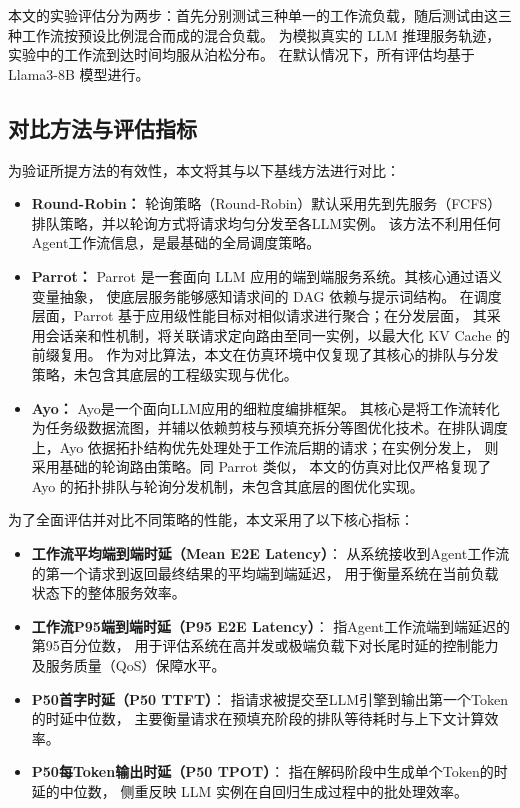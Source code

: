 本文的实验评估分为两步：首先分别测试三种单一的工作流负载，随后测试由这三种工作流按预设比例混合而成的混合负载。
为模拟真实的 LLM 推理服务轨迹，实验中的工作流到达时间均服从泊松分布。
在默认情况下，所有评估均基于 Llama3-8B 模型进行。


\subsection{对比方法与评估指标}

为验证所提方法的有效性，本文将其与以下基线方法进行对比：

\begin{itemize}
  \item \textbf{Round-Robin：}
        轮询策略（Round-Robin）默认采用先到先服务（FCFS）排队策略，并以轮询方式将请求均匀分发至各LLM实例。
        该方法不利用任何Agent工作流信息，是最基础的全局调度策略。

  \item \textbf{Parrot：}
        Parrot 是一套面向 LLM 应用的端到端服务系统。其核心通过语义变量抽象，
        使底层服务能够感知请求间的 DAG 依赖与提示词结构。
        在调度层面，Parrot 基于应用级性能目标对相似请求进行聚合；在分发层面，
        其采用会话亲和性机制，将关联请求定向路由至同一实例，以最大化 KV Cache 的前缀复用。
        作为对比算法，本文在仿真环境中仅复现了其核心的排队与分发策略，未包含其底层的工程级实现与优化。

  \item \textbf{Ayo：}
        Ayo是一个面向LLM应用的细粒度编排框架。
        其核心是将工作流转化为任务级数据流图，并辅以依赖剪枝与预填充拆分等图优化技术。在排队调度上，Ayo 
        依据拓扑结构优先处理处于工作流后期的请求；在实例分发上，
        则采用基础的轮询路由策略。同 Parrot 类似，
        本文的仿真对比仅严格复现了 Ayo 的拓扑排队与轮询分发机制，未包含其底层的图优化实现。
\end{itemize}
\noindent 为了全面评估并对比不同策略的性能，本文采用了以下核心指标：

\begin{itemize}
  \item \textbf{工作流平均端到端时延（Mean E2E Latency）}：
        从系统接收到Agent工作流的第一个请求到返回最终结果的平均端到端延迟，
        用于衡量系统在当前负载状态下的整体服务效率。

  \item \textbf{工作流P95端到端时延（P95 E2E Latency）}：
        指Agent工作流端到端延迟的第95百分位数，
        用于评估系统在高并发或极端负载下对长尾时延的控制能力及服务质量（QoS）保障水平。

  \item \textbf{P50首字时延（P50 TTFT）}：
        指请求被提交至LLM引擎到输出第一个Token的时延中位数，
        主要衡量请求在预填充阶段的排队等待耗时与上下文计算效率。

  \item \textbf{P50每Token输出时延（P50 TPOT）}：
        指在解码阶段中生成单个Token的时延的中位数，
        侧重反映 LLM 实例在自回归生成过程中的批处理效率。
\end{itemize}

